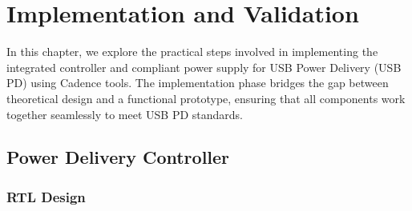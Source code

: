 \chapter{Implementation and Validation}

\indent\indent In this chapter, we explore the practical steps involved in implementing the integrated controller and compliant power supply for USB Power Delivery (USB PD) using Cadence tools. The implementation phase bridges the gap between theoretical design and a functional prototype, ensuring that all components work together seamlessly to meet USB PD standards. 


\section{Power Delivery Controller}

\subsection{RTL Design}
